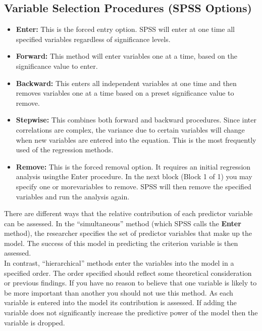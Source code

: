 \documentclass[a4paper,12pt]{article}
\begin{document}
\subsection{Variable Selection Procedures (SPSS Options)}

\begin{itemize}
	\item \textbf{Enter:} This is the forced entry option. SPSS will enter at one time all specified variables regardless of significance levels.
	\item \textbf{Forward:} This method will enter variables one at a time, based on the significance value to enter.
	\item \textbf{Backward:} This enters all independent variables at one time and then removes variables one at a time based on a preset significance value to remove.
	\item \textbf{Stepwise:} This combines both forward and backward procedures. Since inter correlations are complex, the variance due to certain variables will change when new variables are entered into the equation. This is the most frequently used of the regression methods.
	\item \textbf{Remove:} This is the forced removal option. It requires an initial regression analysis usingthe Enter procedure. In the next block (Block 1 of 1) you may specify one or morevariables to remove. SPSS will then remove the specified variables and run the analysis again.
\end{itemize}

\smallskip \noindent There are different ways that the relative contribution of each predictor variable can be assessed. In the “simultaneous” method (which SPSS calls the \textbf{Enter} method), the researcher specifies the set of predictor variables that make up the model. The success of this model in predicting the criterion variable is then assessed.\\
\smallskip
In contrast, “hierarchical” methods enter the variables into the model in a specified order. The order specified should reflect some theoretical consideration or previous
findings. If you have no reason to believe that one variable is likely to be more important than another you should not use this method. As each variable is entered into the model its contribution is assessed. If adding the variable does not significantly increase the predictive power of the model then the variable is
dropped.

\end{document}
